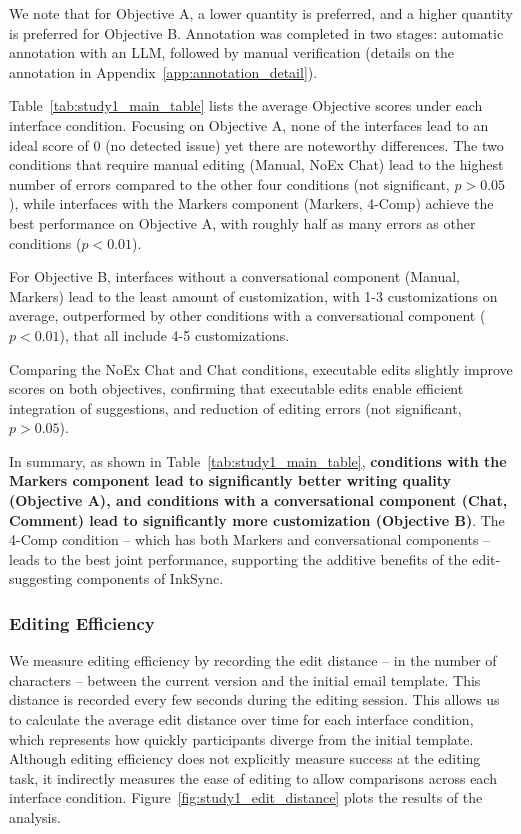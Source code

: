 \documentclass[manuscript]{acmart}
\begin{document}
We note that for Objective A, a lower quantity is preferred, and a higher quantity is preferred for Objective B. Annotation was completed in two stages: automatic annotation with an LLM, followed by manual verification (details on the annotation in Appendix~\ref{app:annotation_detail}).

Table~\ref{tab:study1_main_table} lists the average Objective scores under each interface condition. Focusing on Objective A, none of the interfaces lead to an ideal score of 0 (no detected issue) yet there are noteworthy differences. The two conditions that require manual editing (Manual, NoEx Chat) lead to the highest number of errors compared to the other four conditions (not significant, $p>0.05$), while interfaces with the Markers component (Markers, 4-Comp) achieve the best performance on Objective A, with roughly half as many errors as other conditions ($p<0.01$).

For Objective B, interfaces without a conversational component (Manual, Markers) lead to the least amount of customization, with 1-3 customizations on average, outperformed by other conditions with a conversational component ($p<0.01$), that all include 4-5 customizations.

Comparing the NoEx Chat and Chat conditions, executable edits slightly improve scores on both objectives, confirming that executable edits enable efficient integration of suggestions, and reduction of editing errors (not significant, $p>0.05$).

In summary, as shown in Table~\ref{tab:study1_main_table}, \textbf{conditions with the Markers component lead to significantly better writing quality (Objective A), and conditions with a conversational component (Chat, Comment) lead to significantly more customization (Objective B)}. The 4-Comp condition -- which has both Markers and conversational components -- leads to the best joint performance, supporting the additive benefits of the edit-suggesting components of InkSync.

\subsubsection{Editing Efficiency} \label{sec:study1_evaluation_efficiency}

We measure editing efficiency by recording the edit distance -- in the number of characters -- between the current version and the initial email template. This distance is recorded every few seconds during the editing session. This allows us to calculate the average edit distance over time for each interface condition, which represents how quickly participants diverge from the initial template.
Although editing efficiency does not explicitly measure success at the editing task, it indirectly measures the ease of editing to allow comparisons across each interface condition. Figure~\ref{fig:study1_edit_distance} plots the results of the analysis.
\end{document}
